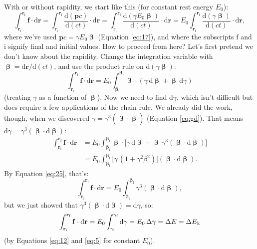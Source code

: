 \documentclass[12pt]{article}
\renewcommand{\vv}[1]{\mathbf{#1}}
\newcommand{\dd}[1]{\mathrm{d}#1}
\newcommand{\vvbeta}{\bm{\upbeta}}
\begin{document}
With or without rapidity, we start like this (for constant rest energy $E_0$):
\begin{equation*}
\int_{\vv r_\textrm{i}}^{\vv r_{\textrm{f}}} \vv f \cdot \dd \vv r = \int_{\vv r_\textrm{i}}^{\vv r_{\textrm{f}}} \frac{\dd (\vv p c)}{\dd (ct)} \cdot \dd \vv r = \int_{\vv r_\textrm{i}}^{\vv r_{\textrm{f}}} \frac{\dd (\gamma E_0 \vvbeta)}{\dd (ct)} \cdot \dd \vv r = E_0 \int_{\vv r_\textrm{i}}^{\vv r_{\textrm{f}}} \frac{\dd (\gamma \vvbeta)}{\dd (ct)} \cdot \dd \vv r ,
\end{equation*}
where we've used $\vv p c = \gamma E_0 \vvbeta$ (Equation \ref{eq:17}), and where the subscripts $\textrm{f}$ and $\textrm{i}$ signify final and initial values. How to proceed from here? Let's first pretend we don't know about the rapidity. Change the integration variable with $\vvbeta = \dd \vv r / \dd (ct)$, and use the product rule on $\dd (\gamma \vvbeta)$:
\begin{equation*}
\int_{\vv r_\textrm{i}}^{\vv r_{\textrm{f}}} \vv f \cdot \dd \vv r = E_0 \int_{\vvbeta_\textrm{i}}^{\vvbeta_{\textrm{f}}} \vvbeta \cdot \left( \gamma \, \dd \vvbeta + \vvbeta \, \dd \gamma \right)
\end{equation*}
(treating $\gamma$ as a function of $\vvbeta$). Now we need to find $\dd \gamma$, which isn't difficult but does require a few applications of the chain rule. We already did the work, though, when we discovered $\dot{\gamma} = \gamma^3 (\vvbeta \cdot \dot{\vvbeta})$ (Equation \ref{eq:gd}). That means $\dd \gamma = \gamma^3 (\vvbeta \cdot \dd \vvbeta)$:
\begin{equation*}
\begin{aligned}
\int_{\vv r_\textrm{i}}^{\vv r_{\textrm{f}}} \vv f \cdot \dd \vv r &= E_0 \int_{\vvbeta_\textrm{i}}^{\vvbeta_{\textrm{f}}} \vvbeta \cdot \bigl[ \gamma \, \dd \vvbeta + \vvbeta \, \gamma^3 ( \vvbeta \cdot \dd \vvbeta ) \bigr] \\[3pt]
&= E_0 \int_{\vvbeta_\textrm{i}}^{\vvbeta_{\textrm{f}}} \bigl[ \gamma \, ( 1 + \gamma^2 \beta^2 ) \bigr] \left( \vvbeta \cdot \dd \vvbeta \right) .
\end{aligned}
\end{equation*}
By Equation \ref{eq:25}, that's:
\begin{equation*}
\int_{\vv r_\textrm{i}}^{\vv r_{\textrm{f}}} \vv f \cdot \dd \vv r = E_0 \int_{\vvbeta_\textrm{i}}^{\vvbeta_{\textrm{f}}} \gamma^3 ( \vvbeta \cdot \dd \vvbeta ),
\end{equation*}
but we just showed that $\gamma^3 ( \vvbeta \cdot \dd \vvbeta ) = \dd \gamma$, so:
\begin{equation*}
\int_{\vv r_\textrm{i}}^{\vv r_{\textrm{f}}} \vv f \cdot \dd \vv r = E_0 \int_{\gamma_\textrm{i}}^{\gamma_{\textrm{f}}} \dd \gamma = E_0 \, \Delta \gamma = \Delta E = \Delta E_{\mkern.5mu \textrm{k}}
\end{equation*}
(by Equations \ref{eq:12} and \ref{eq:5} for constant $E_0$).
\end{document}

